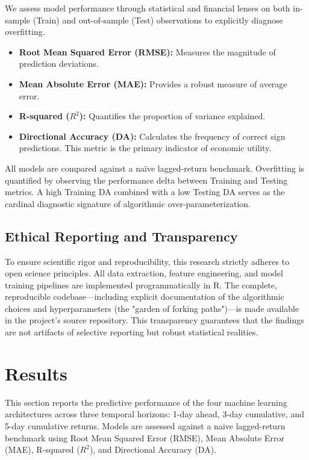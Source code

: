 \documentclass[12pt]{article}
\begin{document}
We assess model performance through statistical and financial lenses on both in-sample (Train) and out-of-sample (Test) observations to explicitly diagnose overfitting.
\begin{itemize}
    \item \textbf{Root Mean Squared Error (RMSE):} Measures the magnitude of prediction deviations.
    \item \textbf{Mean Absolute Error (MAE):} Provides a robust measure of average error.
    \item \textbf{R-squared ($R^2$):} Quantifies the proportion of variance explained.
    \item \textbf{Directional Accuracy (DA):} Calculates the frequency of correct sign predictions. This metric is the primary indicator of economic utility.
\end{itemize}
All models are compared against a naïve lagged-return benchmark. Overfitting is quantified by observing the performance delta between Training and Testing metrics. A high Training DA combined with a low Testing DA serves as the cardinal diagnostic signature of algorithmic over-parameterization.

\subsection{Ethical Reporting and Transparency}

To ensure scientific rigor and reproducibility, this research strictly adheres to open science principles. All data extraction, feature engineering, and model training pipelines are implemented programmatically in R. The complete, reproducible codebase---including explicit documentation of the algorithmic choices and hyperparameters (the "garden of forking paths")---is made available in the project's source repository. This transparency guarantees that the findings are not artifacts of selective reporting but robust statistical realities.

\section{Results}
\label{sec:results}

This section reports the predictive performance of the four machine learning architectures across three temporal horizons: 1-day ahead, 3-day cumulative, and 5-day cumulative returns. Models are assessed against a naive lagged-return benchmark using Root Mean Squared Error (RMSE), Mean Absolute Error (MAE), R-squared ($R^2$), and Directional Accuracy (DA).
\end{document}
